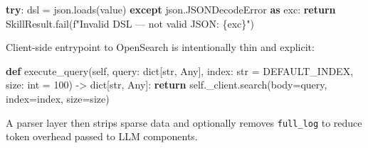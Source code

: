 \documentclass[
]{article}
\newenvironment{Shaded}{}{}
\newcommand{\BuiltInTok}[1]{\textcolor[rgb]{0.00,0.50,0.00}{#1}}
\newcommand{\ControlFlowTok}[1]{\textcolor[rgb]{0.00,0.44,0.13}{\textbf{#1}}}
\newcommand{\DecValTok}[1]{\textcolor[rgb]{0.25,0.63,0.44}{#1}}
\newcommand{\ImportTok}[1]{\textcolor[rgb]{0.00,0.50,0.00}{\textbf{#1}}}
\newcommand{\KeywordTok}[1]{\textcolor[rgb]{0.00,0.44,0.13}{\textbf{#1}}}
\newcommand{\NormalTok}[1]{#1}
\newcommand{\OperatorTok}[1]{\textcolor[rgb]{0.40,0.40,0.40}{#1}}
\newcommand{\SpecialCharTok}[1]{\textcolor[rgb]{0.25,0.44,0.63}{#1}}
\newcommand{\SpecialStringTok}[1]{\textcolor[rgb]{0.73,0.40,0.53}{#1}}
\newcommand{\VariableTok}[1]{\textcolor[rgb]{0.10,0.09,0.49}{#1}}
\begin{document}
\begin{Shaded}
\begin{Highlighting}[]
\ControlFlowTok{try}\NormalTok{:}
\NormalTok{    dsl }\OperatorTok{=}\NormalTok{ json.loads(value)}
\ControlFlowTok{except}\NormalTok{ json.JSONDecodeError }\ImportTok{as}\NormalTok{ exc:}
    \ControlFlowTok{return}\NormalTok{ SkillResult.fail(}\SpecialStringTok{f"Invalid DSL — not valid JSON: }\SpecialCharTok{\{}\NormalTok{exc}\SpecialCharTok{\}}\SpecialStringTok{"}\NormalTok{)}
\end{Highlighting}
\end{Shaded}

Client-side entrypoint to OpenSearch is intentionally thin and explicit:

\begin{Shaded}
\begin{Highlighting}[]
\KeywordTok{def}\NormalTok{ execute\_query(}\VariableTok{self}\NormalTok{, query: }\BuiltInTok{dict}\NormalTok{[}\BuiltInTok{str}\NormalTok{, Any], index: }\BuiltInTok{str} \OperatorTok{=}\NormalTok{ DEFAULT\_INDEX, size: }\BuiltInTok{int} \OperatorTok{=} \DecValTok{100}\NormalTok{) }\OperatorTok{{-}\textgreater{}} \BuiltInTok{dict}\NormalTok{[}\BuiltInTok{str}\NormalTok{, Any]:}
    \ControlFlowTok{return} \VariableTok{self}\NormalTok{.\_client.search(body}\OperatorTok{=}\NormalTok{query, index}\OperatorTok{=}\NormalTok{index, size}\OperatorTok{=}\NormalTok{size)}
\end{Highlighting}
\end{Shaded}

A parser layer then strips sparse data and optionally removes
\texttt{full\_log} to reduce token overhead passed to LLM components.
\end{document}
